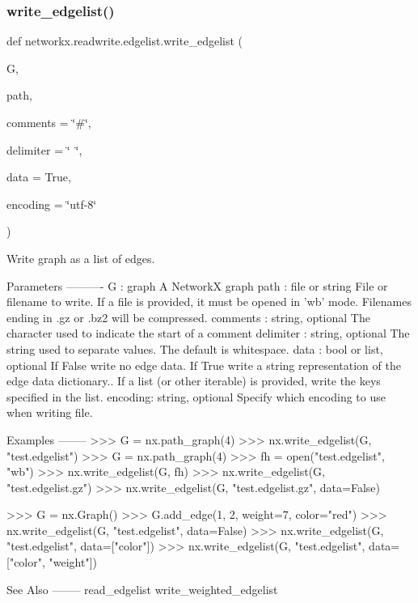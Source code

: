 \subsubsection{\texorpdfstring{write\+\_\+edgelist()}{write\_edgelist()}}
{\footnotesize\ttfamily def networkx.\+readwrite.\+edgelist.\+write\+\_\+edgelist (\begin{DoxyParamCaption}\item[{}]{G,  }\item[{}]{path,  }\item[{}]{comments = {\ttfamily \char`\"{}\#\char`\"{}},  }\item[{}]{delimiter = {\ttfamily \char`\"{}~\char`\"{}},  }\item[{}]{data = {\ttfamily True},  }\item[{}]{encoding = {\ttfamily \char`\"{}utf-\/8\char`\"{}} }\end{DoxyParamCaption})}

\begin{DoxyVerb}Write graph as a list of edges.

Parameters
----------
G : graph
   A NetworkX graph
path : file or string
   File or filename to write. If a file is provided, it must be
   opened in 'wb' mode. Filenames ending in .gz or .bz2 will be compressed.
comments : string, optional
   The character used to indicate the start of a comment
delimiter : string, optional
   The string used to separate values.  The default is whitespace.
data : bool or list, optional
   If False write no edge data.
   If True write a string representation of the edge data dictionary..
   If a list (or other iterable) is provided, write the  keys specified
   in the list.
encoding: string, optional
   Specify which encoding to use when writing file.

Examples
--------
>>> G = nx.path_graph(4)
>>> nx.write_edgelist(G, "test.edgelist")
>>> G = nx.path_graph(4)
>>> fh = open("test.edgelist", "wb")
>>> nx.write_edgelist(G, fh)
>>> nx.write_edgelist(G, "test.edgelist.gz")
>>> nx.write_edgelist(G, "test.edgelist.gz", data=False)

>>> G = nx.Graph()
>>> G.add_edge(1, 2, weight=7, color="red")
>>> nx.write_edgelist(G, "test.edgelist", data=False)
>>> nx.write_edgelist(G, "test.edgelist", data=["color"])
>>> nx.write_edgelist(G, "test.edgelist", data=["color", "weight"])

See Also
--------
read_edgelist
write_weighted_edgelist
\end{DoxyVerb}
 \mbox{\label{namespacenetworkx_1_1readwrite_1_1edgelist_aec8fad11085af20f29bb96017440a0c0}} 
